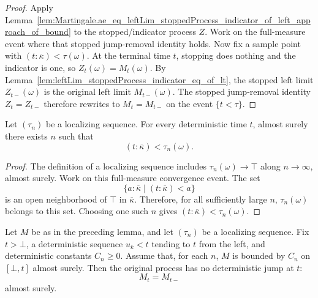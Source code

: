 \begin{proof}
Apply
Lemma~\ref{lem:Martingale.ae_eq_leftLim_stoppedProcess_indicator_of_left_approach_of_bound}
to the stopped/indicator process \(Z\).  Work on the full-measure event where
that stopped jump-removal identity holds.  Now fix a sample point with
\((t:\overline{\kappa})<\tau(\omega)\).  At the terminal time \(t\), stopping
does nothing and the indicator is one, so \(Z_t(\omega)=M_t(\omega)\).  By
Lemma~\ref{lem:leftLim_stoppedProcess_indicator_eq_of_lt}, the stopped left
limit \(Z_{t-}(\omega)\) is the original left limit \(M_{t-}(\omega)\).  The
stopped jump-removal identity \(Z_t=Z_{t-}\) therefore rewrites to
\(M_t=M_{t-}\) on the event \(\{t<\tau\}\).
\end{proof}

\begin{lemma}\label{lem:ProbabilityTheory.IsLocalizingSequence.eventually_exists_gt}
Let \((\tau_n)\) be a localizing sequence.  For every deterministic time
\(t\), almost surely there exists \(n\) such that
\[
  (t:\overline{\kappa})<\tau_n(\omega).
\]
\end{lemma}

\begin{proof}
The definition of a localizing sequence includes
\(\tau_n(\omega)\to\top\) along \(n\to\infty\), almost surely.  Work on this
full-measure convergence event.  The set
\[
  \{a:\overline{\kappa}\mid (t:\overline{\kappa})<a\}
\]
is an open neighborhood of \(\top\) in \(\overline{\kappa}\).  Therefore, for
all sufficiently large \(n\), \(\tau_n(\omega)\) belongs to this set.  Choosing
one such \(n\) gives \((t:\overline{\kappa})<\tau_n(\omega)\).
\end{proof}

\begin{lemma}\label{lem:Martingale.ae_eq_leftLim_localizingSequence_of_left_approach_of_bound}
Let \(M\) be as in the preceding lemma, and let \((\tau_n)\) be a localizing
sequence.  Fix \(t>\bot\), a deterministic sequence \(u_k<t\) tending to \(t\)
from the left, and deterministic constants \(C_n\ge0\).  Assume that, for
each \(n\), \(M\) is bounded by \(C_n\) on \([\bot,t]\) almost surely.  Then
the original process has no deterministic jump at \(t\):
\[
  M_t=M_{t-}
\]
almost surely.
\end{lemma}

